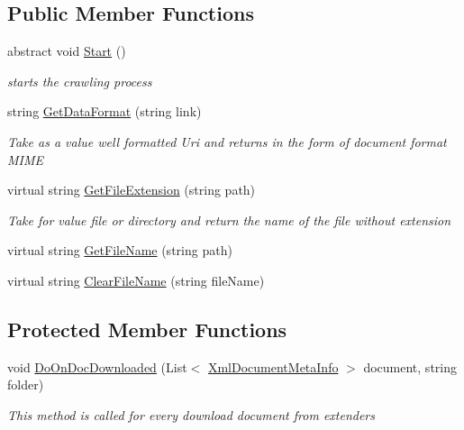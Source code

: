 \subsection*{Public Member Functions}
\begin{DoxyCompactItemize}
\item 
abstract void \hyperlink{class_crawler_1_1_classes_1_1_common_1_1_base_crawler_a14b2a286ce7fb2899bd915dd345bf6b7}{Start} ()
\begin{DoxyCompactList}\small\item\em starts the crawling process \end{DoxyCompactList}\item 
string \hyperlink{class_crawler_1_1_classes_1_1_common_1_1_base_crawler_a38eaaddab528ed6793aae3eb88ce2f42}{Get\-Data\-Format} (string link)
\begin{DoxyCompactList}\small\item\em Take as a value well formatted Uri and returns in the form of document format M\-I\-M\-E \end{DoxyCompactList}\item 
virtual string \hyperlink{class_crawler_1_1_classes_1_1_common_1_1_base_crawler_a4172add0090fde65afe3f6b6d28f0077}{Get\-File\-Extension} (string path)
\begin{DoxyCompactList}\small\item\em Take for value file or directory and return the name of the file without extension \end{DoxyCompactList}\item 
virtual string \hyperlink{class_crawler_1_1_classes_1_1_common_1_1_base_crawler_a5b81bb161f495ea335d47be66060d69c}{Get\-File\-Name} (string path)
\item 
virtual string \hyperlink{class_crawler_1_1_classes_1_1_common_1_1_base_crawler_aba8a07a3e0ea3b690e2da0dc48d6052e}{Clear\-File\-Name} (string file\-Name)
\end{DoxyCompactItemize}
\subsection*{Protected Member Functions}
\begin{DoxyCompactItemize}
\item 
void \hyperlink{class_crawler_1_1_classes_1_1_common_1_1_base_crawler_a2777caf0dec6b2c6bd4f1218d28d83de}{Do\-On\-Doc\-Downloaded} (List$<$ \hyperlink{class_metainfo_e_u_cases_1_1_xml_document_meta_info}{Xml\-Document\-Meta\-Info} $>$ document, string folder)
\begin{DoxyCompactList}\small\item\em This method is called for every download document from extenders \end{DoxyCompactList}\end{DoxyCompactItemize}
